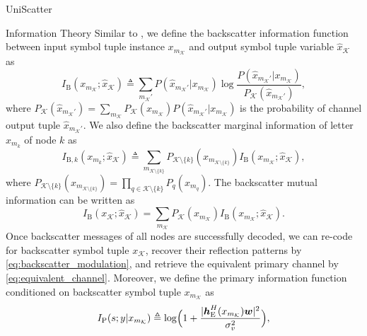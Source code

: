 \documentclass[journal]{IEEEtran}
\begin{document}
\begin{section}{UniScatter}
\begin{subsection}{Information Theory}
		Similar to \cite{Rezaeian2004}, we define the backscatter information function between input symbol tuple instance $x_{m_{\mathcal{K}}}$ and output symbol tuple variable $\hat{x}_{\mathcal{K}}$ as
		\begin{equation}
			I_{\mathrm{B}}(x_{m_{\mathcal{K}}};\hat{x}_{\mathcal{K}}) \triangleq \sum_{m_{\mathcal{K}}'} P(\hat{x}_{m_{\mathcal{K}}'}|x_{m_{\mathcal{K}}}) \log \frac{P(\hat{x}_{m_{\mathcal{K}}'}|x_{m_{\mathcal{K}}})}{P_{\mathcal{K}}(\hat{x}_{m_{\mathcal{K}}'})},
			\label{eq:backscatter_information_function}
		\end{equation}
		where $P_{\mathcal{K}}(\hat{x}_{m_{\mathcal{K}}'}) = \sum_{m_{\mathcal{K}}} P_{\mathcal{K}}(x_{m_{\mathcal{K}}}) P(\hat{x}_{m_{\mathcal{K}}'}|x_{m_{\mathcal{K}}})$ is the probability of channel output tuple $\hat{x}_{m_{\mathcal{K}}'}$.
		We also define the backscatter marginal information of letter $x_{m_k}$ of node $k$ as
		\begin{equation}
			I_{\mathrm{B},k}(x_{m_k};\hat{x}_{\mathcal{K}}) \triangleq \sum_{m_{\mathcal{K} \setminus \{k\}}} P_{\mathcal{K} \setminus \{k\}}(x_{m_{\mathcal{K} \setminus \{k\}}}) I_{\mathrm{B}}(x_{m_{\mathcal{K}}};\hat{x}_{\mathcal{K}}),
			\label{eq:backscatter_marginal_information}
		\end{equation}
		where $P_{\mathcal{K} \setminus \{k\}}(x_{m_{\mathcal{K} \setminus \{k\}}}) = \prod_{q \in \mathcal{K} \setminus \{k\}} P_{q}(x_{m_{q}})$.
		The backscatter mutual information can be written as
		\begin{equation}
			I_{\mathrm{B}}(x_{\mathcal{K}};\hat{x}_{\mathcal{K}}) = \sum_{m_{\mathcal{K}}} P_{\mathcal{K}}(x_{m_{\mathcal{K}}}) I_{\mathrm{B}}(x_{m_{\mathcal{K}}};\hat{x}_{\mathcal{K}}).
			\label{eq:backscatter_mutual_information}
		\end{equation}
		Once backscatter messages of all nodes are successfully decoded, we can re-code for backscatter symbol tuple $x_{\mathcal{K}}$, recover their reflection patterns by \eqref{eq:backscatter_modulation}, and retrieve the equivalent primary channel by \eqref{eq:equivalent_channel}.
		Moreover, we define the primary information function conditioned on backscatter symbol tuple $x_{m_{\mathcal{K}}}$ as
		\begin{equation}
			I_{\mathrm{P}}(s;y|x_{m_{\mathcal{K}}}) \triangleq \log \Bigl(1 + \frac{\lvert \boldsymbol{h}_{\mathrm{E}}^H(x_{m_{\mathcal{K}}}) \boldsymbol{w} \rvert^2}{\sigma_v^2}\Bigr),
			\label{eq:primary_information_function}
		\end{equation}

\end{subsection}
\end{section}
\end{document}
